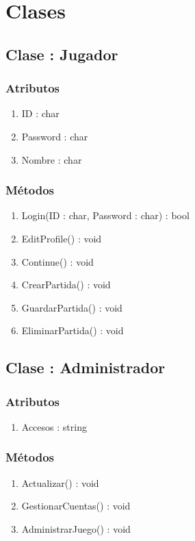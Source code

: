 \section{Clases}\label{sec:uc0}
\subsection{Clase : Jugador}\label{sec:uc0}
\subsubsection{Atributos}
\begin{enumerate}
\item ID : char
\item Password : char
\item Nombre : char
\end{enumerate}

\subsubsection{Métodos}
\begin{enumerate}
\item Login(ID : char, Password : char) : bool
\item EditProfile() : void
\item Continue() : void
\item CrearPartida() : void
\item GuardarPartida() : void
\item EliminarPartida() : void
\end{enumerate}



\subsection{Clase : Administrador}\label{sec:uc0}
\subsubsection{Atributos}
\begin{enumerate}
\item Accesos : string
\end{enumerate}

\subsubsection{Métodos}
\begin{enumerate}
\item Actualizar() : void
\item GestionarCuentas() : void
\item AdministrarJuego() : void
\end{enumerate}



